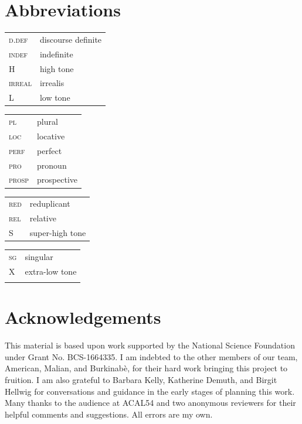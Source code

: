 \documentclass[output=paper,colorlinks,citecolor=brown,
]{langscibook}
\begin{document}
\section*{Abbreviations}


\begin{tabularx}{.45\textwidth}{lQ}
\textsc{d.def} & discourse definite \\
\textsc{indef} & indefinite \\
H & high tone \\
\textsc{irreal} & irrealis \\
L & low tone \\
\end{tabularx}
\begin{tabularx}{.45\textwidth}{lQ}
\textsc{pl} & plural \\
\textsc{loc} & locative \\
\textsc{perf} & perfect \\
\textsc{pro} & pronoun \\
\textsc{prosp} & prospective \\
\end{tabularx}

\begin{tabularx}{.45\textwidth}{lQ}
\textsc{red} & reduplicant \\
\textsc{rel} & relative \\
S & super-high tone \\
\end{tabularx}
\begin{tabularx}{.45\textwidth}{lQ}
\textsc{sg} & singular \\
X & extra-low tone \\
\\
\end{tabularx}


\section*{Acknowledgements}

This material is based upon work supported by the National Science Foundation under Grant No. BCS-1664335. I am indebted to the other members of our team, American, Malian, and Burkinabè, for their hard work bringing this project to fruition. I am also grateful to Barbara Kelly, Katherine Demuth, and Birgit Hellwig for conversations and guidance in the early stages of planning this work. Many thanks to the audience at ACAL54 and two anonymous reviewers for their helpful comments and suggestions. All errors are my own.


\sloppy %

\printbibliography[heading=subbibliography,notkeyword=this]
\end{document}
